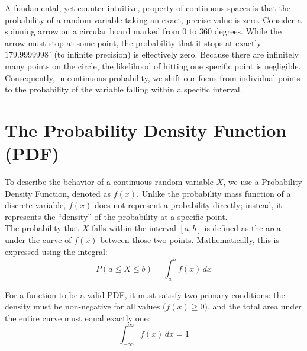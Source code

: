 \documentclass[12pt]{scrartcl}
\begin{document}
A fundamental, yet counter-intuitive, property of continuous spaces is that the probability of a random variable taking an exact, precise value is zero. Consider a spinning arrow on a circular board marked from 0 to 360 degrees. While the arrow must stop at some point, the probability that it stops at exactly $179.9999998^\circ$ (to infinite precision) is effectively zero. Because there are infinitely many points on the circle, the likelihood of hitting one specific point is negligible. Consequently, in continuous probability, we shift our focus from individual points to the probability of the variable falling within a specific interval.

\section{The Probability Density Function (PDF)}

To describe the behavior of a continuous random variable $X$, we use a Probability Density Function, denoted as $f(x)$. Unlike the probability mass function of a discrete variable, $f(x)$ does not represent a probability directly; instead, it represents the ``density'' of the probability at a specific point. \\

The probability that $X$ falls within the interval $[a, b]$ is defined as the area under the curve of $f(x)$ between those two points. Mathematically, this is expressed using the integral:
\begin{equation}
	P(a \le X \le b) = \int_{a}^{b} f(x) \, dx
\end{equation}

For a function to be a valid PDF, it must satisfy two primary conditions: the density must be non-negative for all values ($f(x) \ge 0$), and the total area under the entire curve must equal exactly one:
\begin{equation}
	\int_{-\infty}^{\infty} f(x) \, dx = 1
\end{equation}
\end{document}
